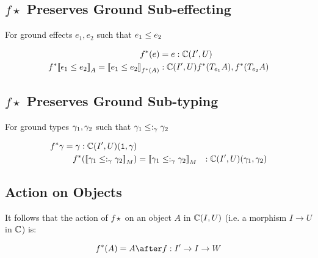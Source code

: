 {\subsection{$f\star$ Preserves Ground Sub-effecting}
For ground effects $e_1, e_2$ such that $e_1\leq e_2$



\begin{align}
    f^*(e) & = e: \mathbb{C}(I', U)\\
    f^*{\bf [\![}\epsilon_1\leq e_2{\bf ]\!]}_A = {\bf [\![}e_1 \leq e_2{\bf ]\!]}_{f^*(A)} &:\mathbb{C}(I', U){f^*(T_{e_1}{A}), f^*(T_{e_2}{A})} \\
\end{align}
\subsection{$f\star$ Preserves Ground Sub-typing}
For ground types $\gamma_1, \gamma_2$ such that $\gamma_1\leq:_\gamma\gamma_2$

\begin{align}
    f^*{\gamma} = \gamma: \mathbb{C}(I', U)(\texttt{1}, \gamma)\\
    f^*({\bf [\![}\gamma_1 \leq:_\gamma \gamma_2{\bf ]\!]}_M) & = {\bf [\![}\gamma_1 \leq:_\gamma \gamma_2{\bf ]\!]}_M &: \mathbb{C}(I', U)(\gamma_1, \gamma_2)\\
\end{align}

\subsection{Action on Objects}

It follows that the action of $f\star$ on an object $A$ in $\mathbb{C}(I, U)$ (i.e. a morphism $I \rightarrow U$ in $\mathbb{C}$) is:

\begin{equation}
    f\star(A) = A\after f: I'\rightarrow I\rightarrow W
\end{equation}
}



